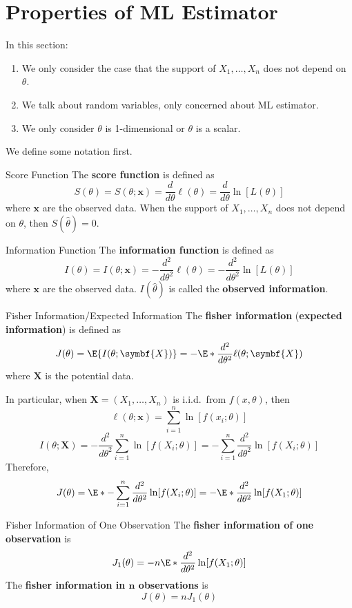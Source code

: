 \section{Properties of ML Estimator}
In this section:
\begin{enumerate}
    \item We only consider the case that the support of $ X_1,\ldots,X_n $
          does not depend on $ \theta $.
    \item We talk about random variables, only concerned
          about ML estimator.
    \item We only consider $ \theta $ is 1-dimensional or $ \theta $
          is a scalar.
\end{enumerate}
We define some notation first.
\begin{Definition}{Score Function}{}
    The \textbf{score function} is defined as
    \[ S(\theta)=S(\theta;\symbf{x})=
        \frac{d}{d\theta}\ell(\theta)=
        \frac{d}{d\theta}\ln[L(\theta)]   \]
    where $ \symbf{x} $ are the observed data.
    When the support of $ X_1,\ldots,X_n $ does not depend
    on $ \theta $, then $ S(\hat{\theta})=0 $.
\end{Definition}
\begin{Definition}{Information Function}{}
    The \textbf{information function} is defined as
    \[ I(\theta)=I(\theta;\symbf{x})=-\frac{d^2}{d\theta^2}\ell(\theta)=
        -\frac{d^2}{d\theta^2}\ln[L(\theta)]   \]
    where $ \symbf{x} $ are the observed data. $ I(\hat{\theta}) $
    is called the \textbf{observed information}.
\end{Definition}
\begin{Definition}{Fisher Information/Expected Information}{}
    The \textbf{fisher information} (\textbf{expected information})
    is defined as
    \[ J(\theta)=\E{I(\theta;\symbf{X})}=-\E*{\frac{d^2}{d\theta^2}\ell(\theta;
            \symbf{X}) } \]
    where $ \symbf{X} $ is the potential data.

    In particular, when $ \symbf{X}=(X_1,\ldots,X_n) $
    is i.i.d.\ from $ f(x,\theta) $, then
    \[ \ell(\theta;\symbf{x})=\sum_{i=1}^{n} \ln[f(x_i;\theta)] \]
    \[ I(\theta;\symbf{X})=-\frac{d^2
        }{d\theta^2} \sum_{i=1}^{n}\ln[f(X_i;\theta)]
        =-\sum_{i=1}^{n} \frac{d^2}{d\theta^2}\ln[f(X_i;\theta)]   \]
    Therefore,
    \[ J(\theta)=\E*{-\sum_{i=1}^{n} \frac{d^2}{d\theta^2}\ln[f(X_i;\theta)]}
        =-\E*{\frac{d^2}{d\theta^2}\ln[f(X_1;\theta)]} \]
\end{Definition}
\begin{Definition}{Fisher Information of One Observation}{}
    The \textbf{fisher information of one observation}
    is
    \[ J_1(\theta)=-n\E*{\frac{d^2}{d\theta^2}\ln[f(X_1;\theta)]}  \]
    The \textbf{fisher information in $ \symbf{n} $ observations} is
    \[ J(\theta)=n J_1(\theta) \]
\end{Definition}

